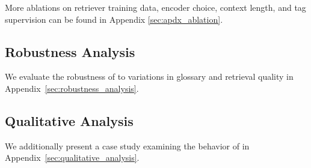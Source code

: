 More ablations on retriever training data, encoder choice, context length, and tag supervision can be found in Appendix \ref{sec:apdx_ablation}.

\subsection{Robustness Analysis}

We evaluate the robustness of \method to variations in glossary and retrieval quality in Appendix~\ref{sec:robustness_analysis}.

\subsection{Qualitative Analysis}

We additionally present a case study examining the behavior of \method in Appendix~\ref{sec:qualitative_analysis}.

